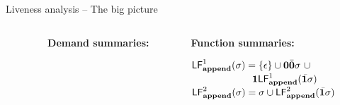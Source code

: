 \documentclass[xcolor=x11names,compress,mathserif]{beamer}
\renewcommand{\(}{\begin{columns}}
\renewcommand{\)}{\end{columns}}
\newcommand{\<}[1]{\begin{column}{#1}}
\renewcommand{\>}{\end{column}}
\begin{document}
\begin{frame}[t]{Liveness analysis -- The big picture}
\begin{columns}[c]
\begin{column}[T]{0.40\textwidth}
 \end{column}
 \begin{column}[T]{0.30\textwidth}
\scriptsize
\centerline{\bf Demand summaries:}
 \end{column}
 \begin{column}[T]{0.38\textwidth}
\scriptsize
\centerline{\bf Function summaries:}
\bigskip
$\mathsf{LF}_{\mathit {\mathbf{append}}}^{1}( {\mathit \sigma}) = \{\epsilon\} \cup \mathbf{0}\bar{\mathbf{0}}\sigma ~
\cup$ \\ 
$ \;\;\;\;\;\;\;\;\;\;\;\;\;\;\;\;\;\;\;\;\;\;\mathbf{1}\mathsf{LF}_{\mathit {\mathbf{append}}}^{1}( {\mathit {\bar{\mathbf{1}}}\sigma})$\\
$\mathsf{LF}_{\mathit {\mathbf{append}}}^{2}( {\mathit \sigma}) = \sigma \cup \mathsf{LF}_{\mathit {\mathbf{append}}}^{2}( {\mathit {\bar{\mathbf{1}}}\sigma})$
 \end{column}
\end{columns}
\end{frame}

\end{document}
